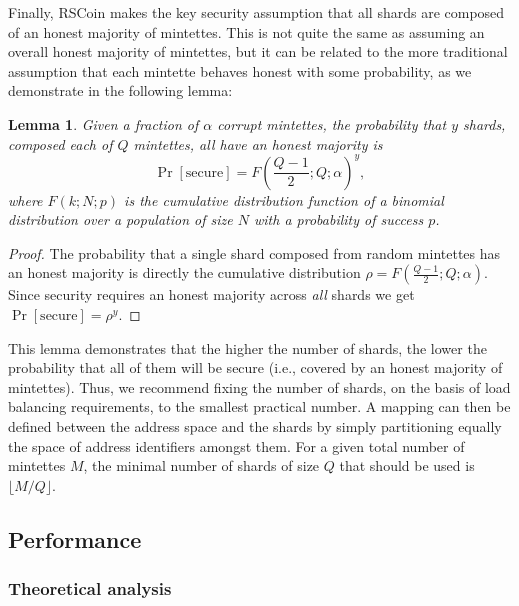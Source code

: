 \documentclass[conference]{IEEEtran}
\newtheorem{lemma}[theorem]{Lemma}
\newcommand{\rscoin}{\textsf{RSCoin}\xspace}
\begin{document}
Finally, \rscoin makes the key security assumption that all shards are
composed of an honest majority of mintettes.  This is
not quite the same as assuming an overall honest majority of mintettes, but it
can be related to the more traditional assumption that each
mintette behaves honest with some probability, as we demonstrate in the
following lemma:

\begin{lemma}\label{lem:threshold}
Given a fraction of $\alpha$ corrupt mintettes, the probability that $y$
shards,
composed each of $Q$ mintettes, all have an honest majority is
\begin{equation*}
\Pr[\text{secure}] = F\left( \frac{Q-1}{2}; Q; \alpha \right)^y,
\end{equation*}
where $F(k;N;p)$ is the cumulative distribution function of a binomial
distribution over a population of size $N$ with a probability of success $p$.
\end{lemma}

\begin{proof}
The probability that a single shard composed from random mintettes has an
honest
majority is directly the cumulative distribution $\rho = F\left(
\frac{Q-1}{2}; Q; \alpha \right)$.
Since security requires an honest majority across \emph{all} shards we get
$\Pr[\text{secure}] =  \rho^y$.
\end{proof}

This lemma demonstrates that the higher the number of shards, the lower the
probability that all of them will be secure (i.e., covered by an honest
majority of mintettes).  Thus, we recommend fixing the number of shards, on
the
basis of load balancing requirements, to the smallest practical number.  A
mapping can then be defined between the address space and the shards by simply
partitioning equally the space of address identifiers amongst them. For a
given
total number of mintettes $M$, the minimal number of shards of size $Q$ that
should be used is $\lfloor{M / Q}\rfloor$.

\subsection{Performance}\label{sec:performance}

\subsubsection{Theoretical analysis}\label{sec:envelope-numbers}
\end{document}
